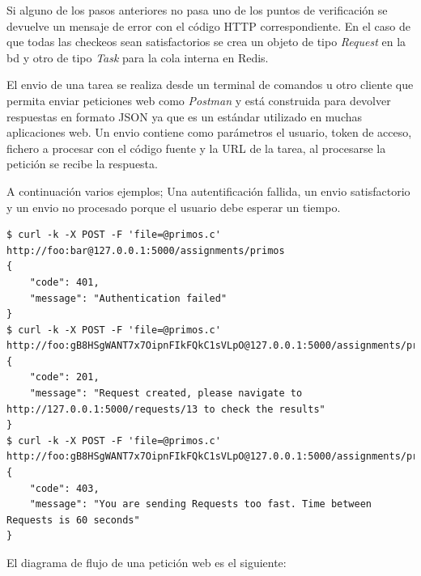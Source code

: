 \documentclass[11pt,spanish,listoffigures,listoftables]{tfgetsinf}
\begin{document}
Si alguno de los pasos anteriores no pasa uno de los puntos de verificación se devuelve un mensaje de error con el código HTTP correspondiente. En el caso de que todas las checkeos sean satisfactorios se crea un objeto de tipo \textit{Request} en la \acrshort{bd} y otro de tipo \textit{Task} para la \Gls{cola} interna en Redis.

El \Gls{envio} de una \Gls{tarea} se realiza desde un terminal de comandos u otro cliente que permita enviar peticiones web como \textit{Postman} y está construida para devolver respuestas en formato JSON ya que es un estándar utilizado en muchas aplicaciones web. Un \Gls{envio} contiene como parámetros el usuario, token de acceso, fichero a procesar con el código fuente y la URL de la \Gls{tarea}, al procesarse la petición se recibe la respuesta.

A continuación varios ejemplos; Una autentificación fallida, un \gls{envio} satisfactorio y un \Gls{envio} no procesado porque el usuario debe esperar un tiempo.

\begin{lstlisting}[style=ascii-tree]
$ curl -k -X POST -F 'file=@primos.c' http://foo:bar@127.0.0.1:5000/assignments/primos
{
	"code": 401,
	"message": "Authentication failed"
}
$ curl -k -X POST -F 'file=@primos.c' http://foo:gB8HSgWANT7x7OipnFIkFQkC1sVLpO@127.0.0.1:5000/assignments/primos
{
	"code": 201,
	"message": "Request created, please navigate to http://127.0.0.1:5000/requests/13 to check the results"
}
$ curl -k -X POST -F 'file=@primos.c' http://foo:gB8HSgWANT7x7OipnFIkFQkC1sVLpO@127.0.0.1:5000/assignments/primos
{
	"code": 403,
	"message": "You are sending Requests too fast. Time between Requests is 60 seconds"
}
\end{lstlisting}

El diagrama de flujo de una petición web es el siguiente:
\end{document}
